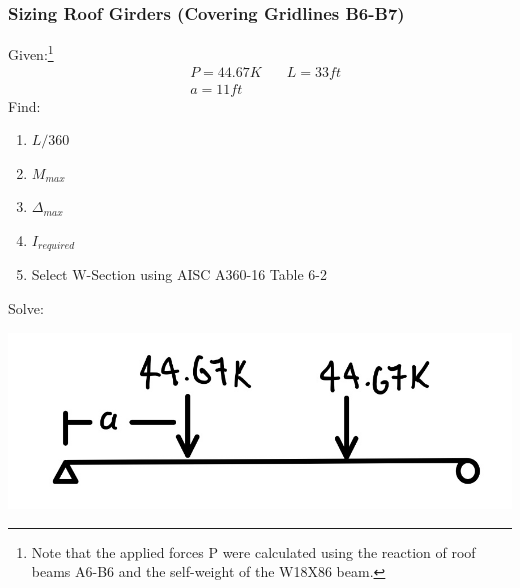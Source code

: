 \documentclass{report} %
\begin{document}
\newpage
\subsubsection*{Sizing Roof Girders (Covering Gridlines B6-B7)}

Given:\footnote{Note that the applied forces P were calculated using the reaction of roof beams A6-B6 and the self-weight of the W18X86 beam.}
\begin{equation*}
    \begin{aligned}
        &P = 44.67K &\quad L = 33ft \\%
        &a = 11ft 
    \end{aligned}
\end{equation*}
Find: %
\begin{enumerate}
    \item $L/360$
    \item $M_{max}$
    \item $\Delta _{max}$
    \item $I_{required}$
    \item Select W-Section using AISC A360-16 Table 6-2
\end{enumerate}
Solve:

\begin{center}
    \includegraphics[scale=0.25]{RoofGirder_B6_B7_Loads}
\end{center}
\end{document}
